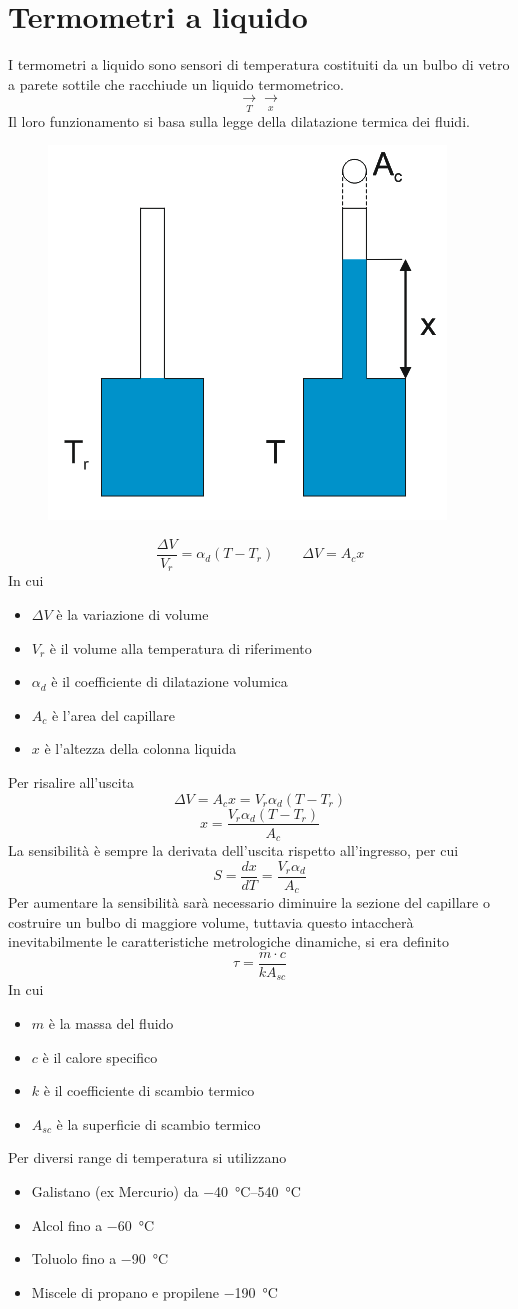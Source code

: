 \documentclass[a4paper, 15pt]{article}
\begin{document}
\section{Termometri a liquido}
\begin{adjustwidth}{2in}{}
	I termometri a liquido sono sensori di temperatura costituiti da un bulbo di vetro a parete sottile che racchiude un liquido termometrico. 
	\[\underset{T}{\rightarrow}\boxed{}\underset{x}{\rightarrow}\]
	Il loro funzionamento si basa sulla legge della dilatazione termica dei fluidi.
	\begin{figure}[H]
		\centering
		\includegraphics[width=0.2\linewidth]{immagini/screenshot003}
		\label{fig:screenshot003}
	\end{figure}
	\[\dfrac{\Delta V}{V_r} = \alpha_d(T-T_r) \qquad \Delta V = A_cx\]
	In cui
	\begin{itemize}
		\item $\Delta V$ è la variazione di volume 
		\item $V_r$ è il volume alla temperatura di riferimento
		\item $\alpha_d$ è il coefficiente di dilatazione volumica
		\item $A_c$ è l'area del capillare
		\item $x$ è l'altezza della colonna liquida 
	\end{itemize}
	Per risalire all'uscita
	\[\Delta V = A_cx = V_r\alpha_d(T-T_r)\]
	\[x = \dfrac{V_r\alpha_d(T-T_r)}{A_c}\]
	La sensibilità è sempre la derivata dell'uscita rispetto all'ingresso, per cui
	\[S = \dfrac{dx}{dT} = \dfrac{V_r\alpha_d}{A_c}\]
	Per aumentare la sensibilità sarà necessario diminuire la sezione del capillare o	costruire un bulbo di maggiore volume, tuttavia questo intaccherà inevitabilmente le caratteristiche metrologiche dinamiche, si era definito
	\[\tau = \dfrac{m \cdot c}{kA_{sc}}\]
	In cui
	\begin{itemize}
		\item $m$ è la massa del fluido
		\item $c$ è il calore specifico
		\item $k$ è il coefficiente di scambio termico
		\item $A_{sc}$ è la superficie di scambio termico
	\end{itemize}
	Per diversi range di temperatura si utilizzano
	\begin{itemize}
		\item Galistano (ex Mercurio) da \SIrange{-40}{540}{\celsius}
		\item Alcol fino a \SI{-60}{\celsius}
		\item Toluolo fino a \SI{-90}{\celsius}
		\item Miscele di propano e propilene \SI{-190}{\celsius}
	\end{itemize}
\end{adjustwidth}
\newpage
\end{document}
